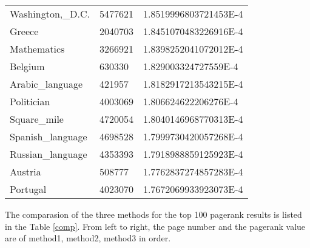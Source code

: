 \documentclass[a4paper]{article}
\begin{document}
\begin{center}
\begin{longtable}{|l|l|l|}
Washington,\_D.C. & 5477621 & 1.8519996803721453E-4 \\
Greece & 2040703 & 1.8451070483226916E-4 \\
Mathematics & 3266921 & 1.8398252041072012E-4 \\
Belgium & 630330 & 1.829003324727559E-4 \\
Arabic\_language & 421957 & 1.8182917213543215E-4 \\
Politician & 4003069 & 1.806624622206276E-4 \\
Square\_mile & 4720054 & 1.8040146968770313E-4 \\
Spanish\_language & 4698528 & 1.7999730420057268E-4 \\
Russian\_language & 4353393 & 1.7918988859125923E-4 \\
Austria & 508777 & 1.7762837274857283E-4 \\
Portugal & 4023070 & 1.7672069933923073E-4 \\
\end{longtable}
\end{center}

The comparasion of the three methods for the top 100 pagerank results is listed in the Table \ref{comp}. From left to right, the page number and the pagerank value are of method1, method2, method3 in order.
\end{document}
